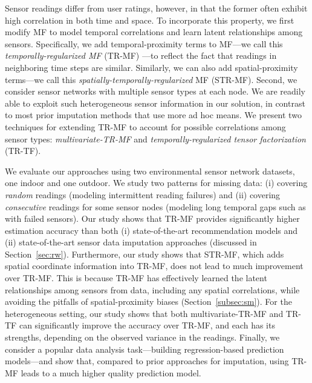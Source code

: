 Sensor readings differ from user ratings, however, in that the former
often exhibit high correlation in both time and space.
To incorporate this property, we first modify MF
to model temporal correlations and learn latent relationships among
sensors.  Specifically, we add temporal-proximity terms to
MF---we call this {\em temporally-regularized MF} (TR-MF)
---to reflect the fact that readings in neighboring time steps are similar.
Similarly, we can also add spatial-proximity terms---we 
call this {\em spatially-temporally-regularized} MF (STR-MF).
Second, we consider sensor networks with multiple sensor types at each node.
We are readily able to exploit such heterogeneous sensor information in our
solution, in contrast to most prior imputation methods that use more ad hoc means.
We present two techniques for extending 
TR-MF to account for possible correlations among sensor types: {\em multivariate-TR-MF} and 
{\em temporally-regularized tensor factorization} (TR-TF).

We evaluate our approaches using two environmental sensor network
datasets, one indoor and one outdoor.
We study two patterns for missing data: (i) covering
{\em random} readings (modeling intermittent reading failures) and (ii)
covering {\em consecutive} readings for some sensor nodes
(modeling long temporal gaps such as with failed sensors).
Our study shows that TR-MF provides significantly higher estimation accuracy than 
both (i) state-of-the-art recommendation models and (ii) state-of-the-art sensor data imputation approaches 
(discussed in Section~\ref{sec:rw}).
Furthermore, our study shows that STR-MF, which adds spatial
coordinate information into TR-MF, 
does not lead to much improvement over TR-MF.
This is because TR-MF has effectively learned the latent
relationships among sensors from data, including any spatial correlations, while
avoiding the pitfalls of spatial-proximity biases (Section~\ref{subsec:sm}).
For the heterogeneous setting, our study shows that both
multivariate-TR-MF and TR-TF can significantly improve the accuracy over TR-MF,
and each has its strengths, depending on the observed variance in the
readings.  Finally, we consider a popular data analysis task---building regression-based prediction models---and show that,
compared to prior approaches for imputation, using TR-MF leads to a much higher quality prediction model.

